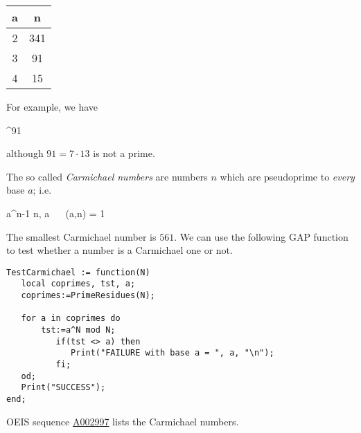 \vspace{3mm}

\begin{tabular}{|c|c|} \hline
  a & n  \\ \hline
  2 & 341 \\
  3 & 91 \\
  4 & 15 \\ \hline
\end{tabular}

\vspace{3mm}

For example, we have

^{91}  
\eee

although $91 = 7 \cdot 13$ is not a prime.

The so called \emph{Carmichael numbers} are numbers $n$ which are pseudoprime to \emph{every} base $a$; i.e.

\bee
a^{n-1}  \mod n, \forall a \,\,  \,\, \gcd(a,n) = 1
\eee

The smallest Carmichael number is $561$. We can use the following GAP function to test whether a number is a Carmichael one or not.

\begin{verbatim}
TestCarmichael := function(N)
   local coprimes, tst, a;
   coprimes:=PrimeResidues(N);

   for a in coprimes do
       tst:=a^N mod N;
          if(tst <> a) then
             Print("FAILURE with base a = ", a, "\n");
          fi;
   od;
   Print("SUCCESS");
end;
\end{verbatim}

OEIS sequence \href{https://oeis.org/A002997}{A002997} lists the Carmichael numbers.


